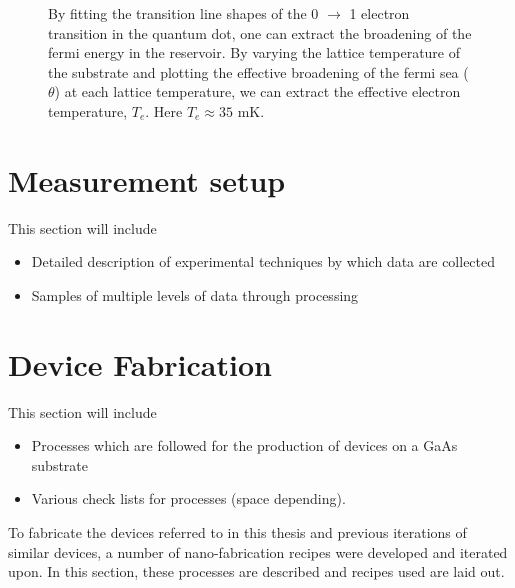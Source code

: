 \label{sec:electrontemp}
\begin{figure}[h]
\centering
{}
\caption{By fitting the transition line shapes of the 0 $\to$ 1 electron transition in the quantum dot, one can extract the broadening of the fermi energy in the reservoir. By varying the lattice temperature of the substrate and plotting the effective broadening of the fermi sea ($\theta$) at each lattice temperature, we can extract the effective electron temperature, $T_e$. Here $T_e \approx 35$ mK. }

\label{fig:etemp}       %
\end{figure}

\chapter{Measurement setup}
This section will include 
\begin{itemize}
\item Detailed description of experimental techniques by which data are collected
\item Samples of multiple levels of data through processing
\end{itemize}

\chapter{Device Fabrication}
This section will include 
\begin{itemize}
\item Processes which are followed for the production of devices on a GaAs substrate
\item Various check lists for processes (space depending).
\end{itemize}
To fabricate the devices referred to in this thesis and previous iterations of similar devices, a number of nano-fabrication recipes were developed and iterated upon. In this section, these processes are described and recipes used are laid out. 
